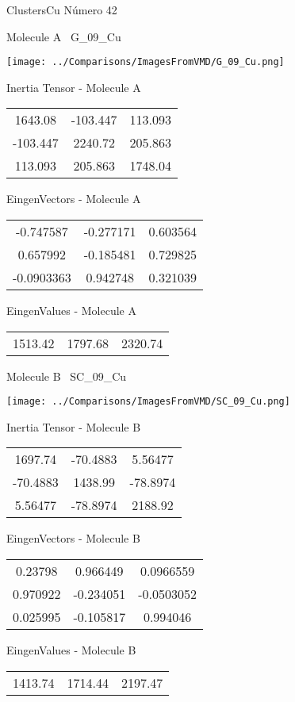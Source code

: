 \vtab[-3cm]
\begin{center}
{\large ClustersCu \tab Número 42}
\end{center}
\begin{multicols}{2}
\begin{center}

Molecule A \
G\_09\_Cu

\texttt{[image: ../Comparisons/ImagesFromVMD/G\_09\_Cu.png]}

Inertia Tensor - Molecule A \\
\begin{tabular}{|c c c|}
1643.08	 & 	-103.447	 & 	113.093	 \\
-103.447	 & 	2240.72	 & 	205.863	 \\
113.093	 & 	205.863	 & 	1748.04
\end{tabular}

\vtab
 EingenVectors - Molecule A     \\
\begin{tabular}{|c c c|}
-0.747587	 & 	-0.277171	 & 	0.603564	 \\
0.657992	 & 	-0.185481	 & 	0.729825	 \\
-0.0903363	 & 	0.942748	 & 	0.321039
\end{tabular}

\vtab
 EingenValues - Molecule A     \\
\begin{tabular}{|c c c|}
1513.42	 & 	1797.68	 & 	2320.74	 \\
\end{tabular}
\columnbreak

Molecule B \
SC\_09\_Cu

\texttt{[image: ../Comparisons/ImagesFromVMD/SC\_09\_Cu.png]}

Inertia Tensor - Molecule B \\
\begin{tabular}{|c c c|}
1697.74	 & 	-70.4883	 & 	5.56477	 \\
-70.4883	 & 	1438.99	 & 	-78.8974	 \\
5.56477	 & 	-78.8974	 & 	2188.92
\end{tabular}

\vtab
 EingenVectors - Molecule B     \\
\begin{tabular}{|c c c|}
0.23798	 & 	0.966449	 & 	0.0966559	 \\
0.970922	 & 	-0.234051	 & 	-0.0503052	 \\
0.025995	 & 	-0.105817	 & 	0.994046
\end{tabular}

\vtab
 EingenValues - Molecule B     \\
\begin{tabular}{|c c c|}
1413.74	 & 	1714.44	 & 	2197.47	 \\
\end{tabular}

\end{center}
\end{multicols}

